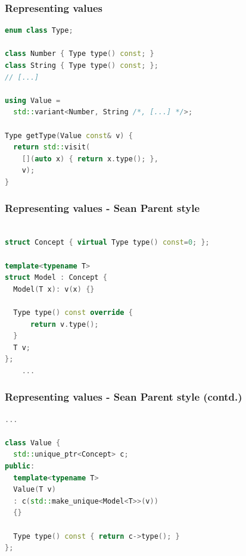 \documentclass{beamer}
\begin{document}

\begin{frame}[fragile]
  \frametitle{Representing values}

  \begin{lstlisting}[language={C++}]
enum class Type;
    
class Number { Type type() const; }
class String { Type type() const; };
// [...]

using Value =
  std::variant<Number, String /*, [...] */>;

Type getType(Value const& v) {
  return std::visit(
    [](auto x) { return x.type(); },
    v);  
}
  \end{lstlisting}
\end{frame}


\begin{frame}[fragile]
  \frametitle{Representing values - Sean Parent style}

  \begin{lstlisting}[language={C++}]

struct Concept { virtual Type type() const=0; };
  
template<typename T>
struct Model : Concept {
  Model(T x): v(x) {}  
    
  Type type() const override {
      return v.type();
  }
  T v;
};
    ...
  \end{lstlisting}
\end{frame}
\begin{frame}[fragile]
    \frametitle{Representing values - Sean Parent style (contd.)}
    \begin{lstlisting}[language={C++}]
    ...
      
class Value {
  std::unique_ptr<Concept> c;
public:
  template<typename T>
  Value(T v)
  : c(std::make_unique<Model<T>>(v))
  {}

  Type type() const { return c->type(); }
};
  \end{lstlisting}
\end{frame}
\end{document}
